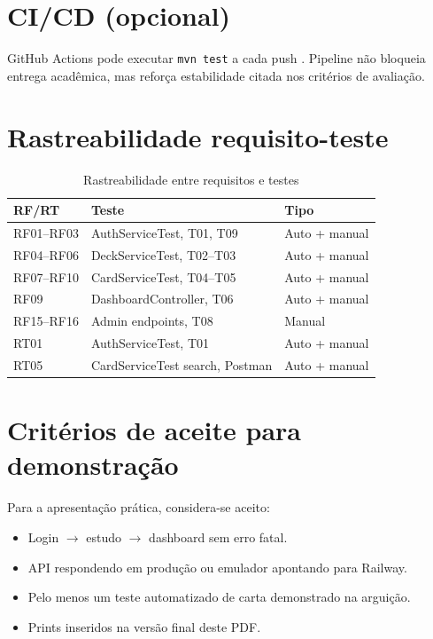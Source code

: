 \section{CI/CD (opcional)}

GitHub Actions pode executar \texttt{mvn test} a cada push \cite{github_actions}. Pipeline não bloqueia entrega acadêmica, mas reforça estabilidade citada nos critérios de avaliação.

\section{Rastreabilidade requisito-teste}

\begin{table}[htbp]
    \caption{Rastreabilidade entre requisitos e testes}
    \label{tab:rastreabilidade}
    \centering
    \footnotesize
    \begin{tabular}{lll}
        \toprule
        \textbf{RF/RT} & \textbf{Teste} & \textbf{Tipo} \\
        \midrule
        RF01--RF03 & AuthServiceTest, T01, T09 & Auto + manual \\
        RF04--RF06 & DeckServiceTest, T02--T03 & Auto + manual \\
        RF07--RF10 & CardServiceTest, T04--T05 & Auto + manual \\
        RF09 & DashboardController, T06 & Auto + manual \\
        RF15--RF16 & Admin endpoints, T08 & Manual \\
        RT01 & AuthServiceTest, T01 & Auto + manual \\
        RT05 & CardServiceTest search, Postman & Auto + manual \\
        \bottomrule
    \end{tabular}
\end{table}

\section{Critérios de aceite para demonstração}

Para a apresentação prática, considera-se aceito:
\begin{itemize}
    \item Login $\rightarrow$ estudo $\rightarrow$ dashboard sem erro fatal.
    \item API respondendo em produção ou emulador apontando para Railway.
    \item Pelo menos um teste automatizado de carta demonstrado na arguição.
    \item Prints inseridos na versão final deste PDF.
\end{itemize}
